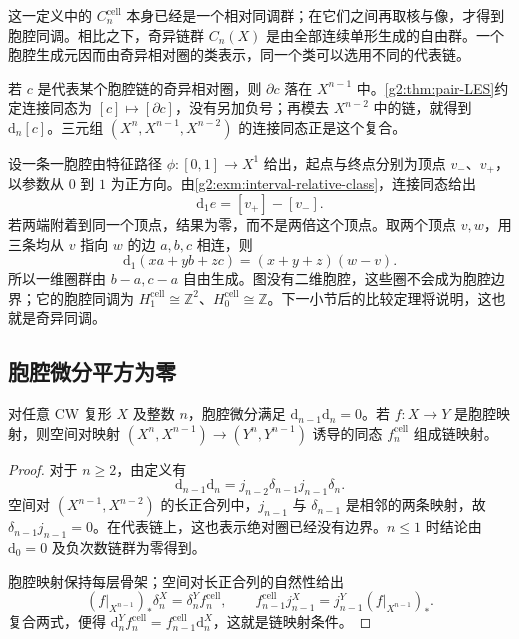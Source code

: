 这一定义中的 \(C_n^{\mathrm{cell}}\) 本身已经是一个相对同调群；在它们之间再取核与像，才得到胞腔同调。相比之下，奇异链群 \(C_n(X)\) 是由全部连续单形生成的自由群。一个胞腔生成元因而由奇异相对圈的类表示，同一个类可以选用不同的代表链。

\ProseParagraphBreak

若 \(c\) 是代表某个胞腔链的奇异相对圈，则 \(\partial c\) 落在 \(X^{n-1}\) 中。\cref{g2:thm:pair-LES}约定连接同态为 \([c]\mapsto[\partial c]\)，没有另加负号；再模去 \(X^{n-2}\) 中的链，就得到 \(\mathrm{d}_n[c]\)。三元组 \((X^n,X^{n-1},X^{n-2})\) 的连接同态正是这个复合。

\begin{example}\label{g2:exm:cellular-edge-boundary}
	设一条一胞腔由特征路径 \(\phi:[0,1]\to X^1\) 给出，起点与终点分别为顶点 \(v_-\)、\(v_+\)，以参数从 \(0\) 到 \(1\) 为正方向。由\cref{g2:exm:interval-relative-class}，连接同态给出
	\[
		\mathrm{d}_1 e=[v_+]-[v_-].
	\]
	若两端附着到同一个顶点，结果为零，而不是两倍这个顶点。取两个顶点 \(v,w\)，用三条均从 \(v\) 指向 \(w\) 的边 \(a,b,c\) 相连，则
	\[
		\mathrm{d}_1(xa+yb+zc)=(x+y+z)(w-v).
	\]
	所以一维圈群由 \(b-a,c-a\) 自由生成。图没有二维胞腔，这些圈不会成为胞腔边界；它的胞腔同调为 \(H_1^{\mathrm{cell}}\cong\mathbb Z^2\)、\(H_0^{\mathrm{cell}}\cong\mathbb Z\)。下一小节后的比较定理将说明，这也就是奇异同调。
\end{example}

\subsection{胞腔微分平方为零}
\label{g2:subsec:0301:03}
\begin{proposition}\label{g2:prop:cellular-d-square}
	对任意 CW 复形 \(X\) 及整数 \(n\)，胞腔微分满足 \(\mathrm{d}_{n-1}\mathrm{d}_n=0\)。若 \(f:X\to Y\) 是胞腔映射，则空间对映射 \((X^n,X^{n-1})\to(Y^n,Y^{n-1})\) 诱导的同态 \(f_n^{\mathrm{cell}}\) 组成链映射。
\end{proposition}
\begin{proof}
	对于 \(n\ge2\)，由定义有
	\[
		\mathrm{d}_{n-1}\mathrm{d}_n
		=j_{n-2}\delta_{n-1}j_{n-1}\delta_n.
	\]
	空间对 \((X^{n-1},X^{n-2})\) 的长正合列中，\(j_{n-1}\) 与 \(\delta_{n-1}\) 是相邻的两条映射，故 \(\delta_{n-1}j_{n-1}=0\)。在代表链上，这也表示绝对圈已经没有边界。\(n\le1\) 时结论由 \(\mathrm{d}_0=0\) 及负次数链群为零得到。

	胞腔映射保持每层骨架；空间对长正合列的自然性给出
	\[
		(f|_{X^{n-1}})_*\delta_n^X=\delta_n^Y f_n^{\mathrm{cell}},\qquad
		f_{n-1}^{\mathrm{cell}}j_{n-1}^X=j_{n-1}^Y(f|_{X^{n-1}})_*.
	\]
	复合两式，便得 \(\mathrm{d}_n^Yf_n^{\mathrm{cell}}=f_{n-1}^{\mathrm{cell}}\mathrm{d}_n^X\)，这就是链映射条件。
\end{proof}

